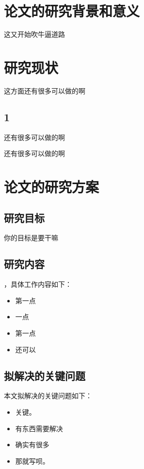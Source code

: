 \chapter{论文的研究背景和意义}

这又开始吹牛逼道路

\chapter{研究现状}
这方面还有很多可以做的啊

\section{1}
还有很多可以做的啊

还有很多可以做的啊

\chapter{论文的研究方案}

\section{研究目标}
你的目标是要干嘛

\section{研究内容}
，具体工作内容如下：

\begin{itemize}
	\item
	第一点
	
	\item
    一点
	
	\item
	第一点
	
	\item
    还可以
	
\end{itemize}

\section{拟解决的关键问题}
本文拟解决的关键问题如下：
\begin{itemize}
	\item
	关键。
	
	\item
	有东西需要解决
	
	\item
	确实有很多
	
	\item
	那就写呗。
	
\end{itemize}

